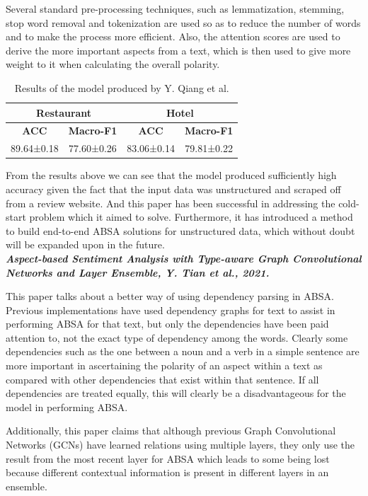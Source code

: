\documentclass[conference]{IEEEtran}
\begin{document}
Several standard pre-processing techniques, such as lemmatization, stemming, stop word removal and tokenization are used so as to reduce the number of words and to make the process more efficient. Also, the attention scores are used to derive the more important aspects from a text, which is then used to give more weight to it when calculating the overall polarity.

\begin{table}[htbp]
\caption{Results of the model produced by Y. Qiang et al.}
\begin{center}
\begin{tabular}{|c|c|c|c|}
\hline
\multicolumn{2}{|c|}{\textbf{Restaurant}} & \multicolumn{2}{|c|}{\textbf{Hotel}} \\
\hline
\textbf{ACC} & \textbf{Macro-F1} & \textbf{ACC} & \textbf{Macro-F1} \\
\hline
89.64±0.18 & 77.60±0.26 & 83.06±0.14 & 79.81±0.22 \\
\hline
\end{tabular}
\end{center}
\end{table}

From the results above we can see that the model produced sufficiently high accuracy given the fact that the input data was unstructured and scraped off from a review website. And this paper has been successful in addressing the cold-start problem which it aimed to solve. Furthermore, it has introduced a method to build end-to-end ABSA solutions for unstructured data, which without doubt will be expanded upon in the future.\\

\textit{\textbf{Aspect-based Sentiment Analysis with
Type-aware Graph Convolutional Networks and Layer Ensemble, Y. Tian et al., 2021.}}

This paper talks about a better way of using dependency parsing in ABSA. Previous implementations have used dependency graphs for text to assist in performing ABSA for that text, but only the dependencies have been paid attention to, not the exact type of dependency among the words. Clearly some dependencies such as the one between a noun and a verb in a simple sentence are more important in ascertaining the polarity of an aspect within a text as compared with other dependencies that exist within that sentence. If all dependencies are treated equally, this will clearly be a disadvantageous for the model in performing ABSA.

Additionally, this paper claims that although previous Graph Convolutional Networks (GCNs) have learned relations using multiple layers, they only use the result from the most recent layer for ABSA which leads to some being lost because different contextual information is present in different layers in an ensemble.
\end{document}
